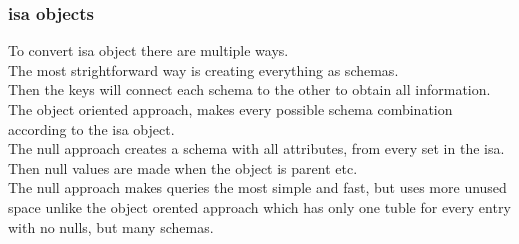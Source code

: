 \documentclass[12pt, a4paper]{article}
\begin{document}
			\subsubsection{isa objects}
				To convert isa object there are multiple ways.\\
				The most strightforward way is creating everything as schemas.\\
				Then the keys will connect each schema to the other to obtain all information.\\
				The object oriented approach, makes every possible schema combination according to the isa object.\\
				The null approach creates a schema with all attributes, from every set in the isa. Then null values are made when the object is parent etc.\\
				The null approach makes queries the most simple and fast, but uses more unused space unlike the object orented approach which has only one tuble for every entry with no nulls, but many schemas.
		
				
\end{document}
